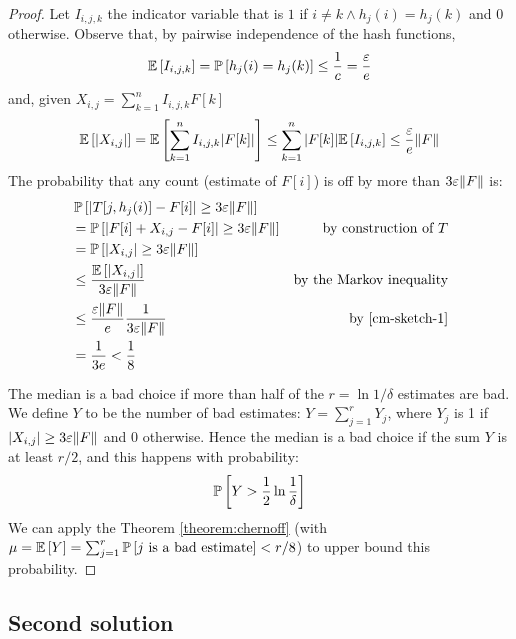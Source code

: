 \begin{proof}
  Let $I_{i,j,k}$ the indicator variable that is $1$ if $i \ne k \wedge h_j(i)=h_j(k)$ and $0$ otherwise. Observe that, by pairwise independence of the hash functions,
  $$\mathbb{E}\left[{I_{i,j,k}}\right] = \operatorname*{\mathbb{P}}\left[{h_j(i)=h_j(k)}\right] \leq \frac{1}{c} = \frac{\varepsilon}{e} $$
  and, given $X_{i,j}=\sum_{k=1}^n I_{i,j,k}F[k]$
  \begin{equation}
    \label{cm-sketch-1}
  	\mathbb{E}\left[{|X_{i,j}|}\right] = \mathbb{E}\left[{\sum_{k=1}^n I_{i,j,k}|F[k]|}\right] \leq \sum_{k=1}^n |F[k]|\mathbb{E}\left[{I_{i,j,k}}\right] \leq \frac{\varepsilon}{e}\lVert F\rVert
  \end{equation}
  The probability that any count (estimate of $F[i]$) is off by more than $3\varepsilon\lVert F\rVert$ is:
  \begin{align*}
    &  \operatorname*{\mathbb{P}}\left[{|T[j, h_j(i)]-F[i]| \geq 3\varepsilon\lVert F\rVert}\right] &  \\
    &= \operatorname*{\mathbb{P}}\left[{|F[i]+X_{i,j}-F[i]| \geq 3\varepsilon\lVert F\rVert}\right] & \text{by construction of $T$} \\
    &= \operatorname*{\mathbb{P}}\left[{|X_{i,j}| \geq 3\varepsilon\lVert F\rVert}\right] & \\
    &\leq \frac{\mathbb{E}\left[{|X_{i,j}|}\right]}{3\varepsilon\lVert F\rVert} & \text{by the Markov inequality} \\
    &\leq \frac{\varepsilon\lVert F\rVert}{e} \frac{1}{3\varepsilon\lVert F\rVert} & \text{by \eqref{cm-sketch-1}} \\
    &= \frac{1}{3e} < \frac{1}{8} &
  \end{align*}
  
  The median is a bad choice if more than half of the $r = \ln 1/\delta$ estimates are bad. We define $Y$ to be the number of bad estimates: $Y = \sum_{j=1}^r Y_j$, where $Y_j$ is 1 if $|X_{i,j}| \geq 3\varepsilon\lVert F\rVert$ and 0 otherwise. Hence the median is a bad choice if the sum $Y$ is at least $r/2$, and this happens with probability:
  $$\operatorname*{\mathbb{P}}\left[{Y > \frac{1}{2}\ln\frac{1}{\delta}}\right]$$
  We can apply the Theorem \ref{theorem:chernoff} (with $\mu = \mathbb{E}\left[{Y}\right] = \sum_{j=1}^r \operatorname*{\mathbb{P}}\left[{j \text{ is a bad estimate}}\right] < r/8$) to upper bound this probability. 
\end{proof}

\subsection{Second solution}

